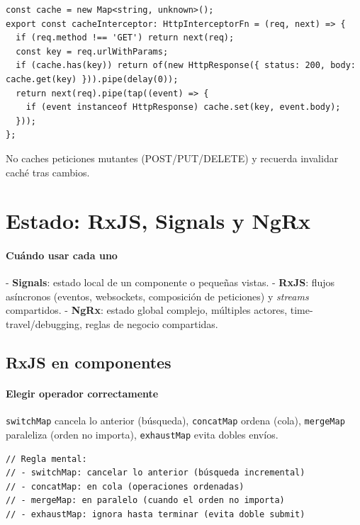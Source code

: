 \documentclass[11pt,a4paper]{article}
\begin{document}
\begin{lstlisting}[style=tsstyle, caption={Interceptor de caché simple por URL y método}]
const cache = new Map<string, unknown>();
export const cacheInterceptor: HttpInterceptorFn = (req, next) => {
  if (req.method !== 'GET') return next(req);
  const key = req.urlWithParams;
  if (cache.has(key)) return of(new HttpResponse({ status: 200, body: cache.get(key) })).pipe(delay(0));
  return next(req).pipe(tap((event) => {
    if (event instanceof HttpResponse) cache.set(key, event.body);
  }));
};
\end{lstlisting}

\begin{warnbox}
No caches peticiones mutantes (POST/PUT/DELETE) y recuerda invalidar caché tras cambios.
\end{warnbox}

\section{Estado: RxJS, Signals y NgRx}
\paragraph{Cuándo usar cada uno}
- \textbf{Signals}: estado local de un componente o pequeñas vistas.
- \textbf{RxJS}: flujos asíncronos (eventos, websockets, composición de peticiones) y \emph{streams} compartidos.
- \textbf{NgRx}: estado global complejo, múltiples actores, time-travel/debugging, reglas de negocio compartidas.

\subsection{RxJS en componentes}
\paragraph{Elegir operador correctamente}
\texttt{switchMap} cancela lo anterior (búsqueda), \texttt{concatMap} ordena (cola), \texttt{mergeMap} paraleliza (orden no importa), \texttt{exhaustMap} evita dobles envíos.

\begin{lstlisting}[style=tsstyle, caption={Elección correcta entre mergeMap/switchMap/concatMap/exhaustMap}]
// Regla mental:
// - switchMap: cancelar lo anterior (búsqueda incremental)
// - concatMap: en cola (operaciones ordenadas)
// - mergeMap: en paralelo (cuando el orden no importa)
// - exhaustMap: ignora hasta terminar (evita doble submit)
\end{lstlisting}
\end{document}
